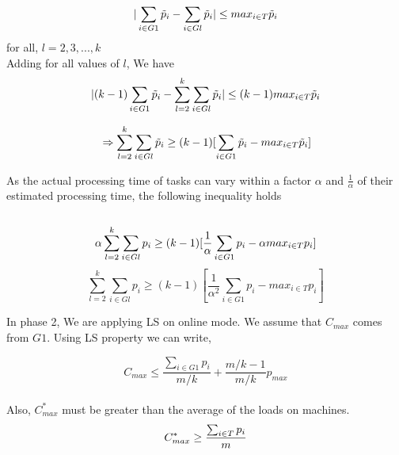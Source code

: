 \documentclass[10pt, conference, compsocconf]{IEEEtran}
\begin{document}
\begin{equation}{\nonumber}
|\sum_{i \in G1 }^{}{\tilde p_{i}}- \sum_{i \in Gl }^{}{\tilde p_{i}}| \leq {max_{i \in T}}{\tilde p_{i}}\end{equation}  \hspace*{15pt}   for all, $l = 2,3,...,k$ \\

Adding for all values of $l$, We have \\

\begin{equation}{\nonumber}
|(k-1)\sum_{i \in G1 }^{}{\tilde p_{i}}- \sum_{l=2}^{k}\sum_{i \in Gl }^{}{\tilde p_{i}}| \leq (k-1) {max_{i \in T}}{\tilde p_{i}}
\end{equation}

\begin{equation}{\nonumber}
\Rightarrow \sum_{l=2}^{k}\sum_{i \in Gl }^{}{\tilde p_{i}} \geq (k-1)[\sum_{i \in G1 }^{}{\tilde p_{i}}- {max_{i \in T}}{\tilde p_{i}}]
\end{equation}



As the actual processing time of tasks  can vary within a factor $\alpha$ and $\frac{1}{\alpha}$ of their estimated processing time, the following inequality holds\\
\\
\begin{equation}{\nonumber}
 \alpha\sum_{l=2}^{k}\sum_{i \in Gl }^{}{{p_{i}}} \geq (k-1)[\frac{1}{\alpha}\sum_{i \in G1 }^{}{{p_{i}}}- \alpha {max_{i \in T}}{{p_{i}}}]
\end{equation}
\begin{equation}
\sum_{l=2}^{k}\sum_{i \in Gl }^{}{{p_{i}}} \geq (k-1)[\frac{1}{\alpha^{2}}\sum_{i \in G1 }^{}{{p_{i}}}-  {max_{i \in T}}{{p_{i}}}]
\end{equation}

In phase 2, We are applying LS on online mode. We assume that $C_{max}$ comes from $G1$. Using LS property we can write,

\begin{equation}
 C_{max} \leq \frac{\sum_{i \in G1 }^{}{{p_{i}}}}{m/k} + {\frac{m/k-1}{m/k}} p_{max} 
\end{equation}
\\

Also, $C_{max}^{*}$ must be greater than the average of the  loads on  machines.\\

\begin{equation}{\nonumber}
C_{max}^{*} \geq  \frac{\sum_{i \in T }^{}{{p_{i}}}}{m}
\end{equation}
\end{document}
